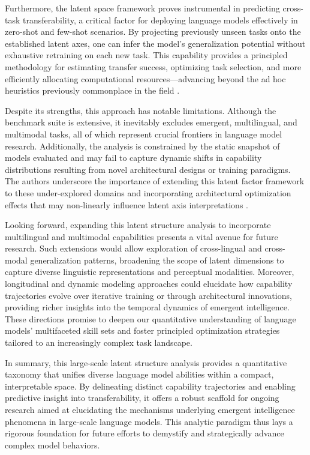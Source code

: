 \documentclass[sigconf]{acmart}
\begin{document}
Furthermore, the latent space framework proves instrumental in predicting cross-task transferability, a critical factor for deploying language models effectively in zero-shot and few-shot scenarios. By projecting previously unseen tasks onto the established latent axes, one can infer the model’s generalization potential without exhaustive retraining on each new task. This capability provides a principled methodology for estimating transfer success, optimizing task selection, and more efficiently allocating computational resources—advancing beyond the ad hoc heuristics previously commonplace in the field \cite{ref45}.

Despite its strengths, this approach has notable limitations. Although the benchmark suite is extensive, it inevitably excludes emergent, multilingual, and multimodal tasks, all of which represent crucial frontiers in language model research. Additionally, the analysis is constrained by the static snapshot of models evaluated and may fail to capture dynamic shifts in capability distributions resulting from novel architectural designs or training paradigms. The authors underscore the importance of extending this latent factor framework to these under-explored domains and incorporating architectural optimization effects that may non-linearly influence latent axis interpretations \cite{ref45}.

Looking forward, expanding this latent structure analysis to incorporate multilingual and multimodal capabilities presents a vital avenue for future research. Such extensions would allow exploration of cross-lingual and cross-modal generalization patterns, broadening the scope of latent dimensions to capture diverse linguistic representations and perceptual modalities. Moreover, longitudinal and dynamic modeling approaches could elucidate how capability trajectories evolve over iterative training or through architectural innovations, providing richer insights into the temporal dynamics of emergent intelligence. These directions promise to deepen our quantitative understanding of language models’ multifaceted skill sets and foster principled optimization strategies tailored to an increasingly complex task landscape.

In summary, this large-scale latent structure analysis provides a quantitative taxonomy that unifies diverse language model abilities within a compact, interpretable space. By delineating distinct capability trajectories and enabling predictive insight into transferability, it offers a robust scaffold for ongoing research aimed at elucidating the mechanisms underlying emergent intelligence phenomena in large-scale language models. This analytic paradigm thus lays a rigorous foundation for future efforts to demystify and strategically advance complex model behaviors.
\end{document}
